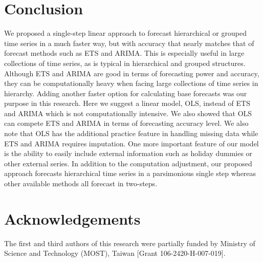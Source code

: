 \documentclass[11pt,a4paper,]{article}
\begin{document}
\hypertarget{conclusion}{%
\section{Conclusion}\label{conclusion}}

We proposed a single-step linear approach to forecast hierarchical or grouped time series in a much faster way, but with accuracy that nearly matches that of forecast methods such as ETS and ARIMA. This is especially useful in large collections of time series, as is typical in hierarchical and grouped structures. Although ETS and ARIMA are good in terms of forecasting power and accuracy, they can be computationally heavy when facing large collections of time series in hierarchy. Adding another faster option for calculating base forecasts was our purpose in this research. Here we suggest a linear model, OLS, instead of ETS and ARIMA which is not computationally intensive. We also showed that OLS can compete ETS and ARIMA in terms of forecasting accuracy level. We also note that OLS has the additional practice feature in handling missing data while ETS and ARIMA requires imputation. One more important feature of our model is the ability to easily include external information such as holiday dummies or other external series. In addition to the computation adjustment, our proposed approach forecasts hierarchical time series in a parsimonious single step whereas other available methods all forecast in two-steps.

\hypertarget{acknowledgements}{%
\section{Acknowledgements}\label{acknowledgements}}

The first and third authors of this research were partially funded by Ministry of Science and Technology (MOST), Taiwan {[}Grant 106-2420-H-007-019{]}.

\printbibliography
\end{document}
